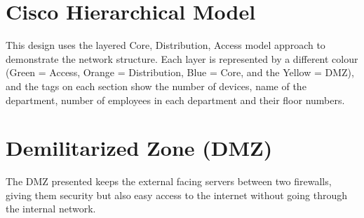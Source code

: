 \documentclass[12pt,oneside]{book}
\begin{document}


\setcounter{page}{2}

\setcounter{page}{2} %
\setcounter{tocdepth}{1}
\tableofcontents
\clearpage


\setcounter{page}{1} %











\clearpage

\printbibliography


\begin{appendices}
\chapter{Cisco Hierarchical Model}
\label{appendix:layered-model}
This design uses the layered Core, Distribution, Access model approach to demonstrate the network structure. Each layer is represented by a different colour (Green = Access, Orange = Distribution, Blue = Core, and the Yellow = DMZ), and the tags on each section show the number of devices, name of the department, number of employees in each department and their floor numbers.
\chapter{Demilitarized Zone (DMZ)}
\label{appendix:dmz}
The DMZ presented keeps the external facing servers between two firewalls, giving them security but also easy access to the internet without going through the internal network.
\end{appendices}
\end{document}
